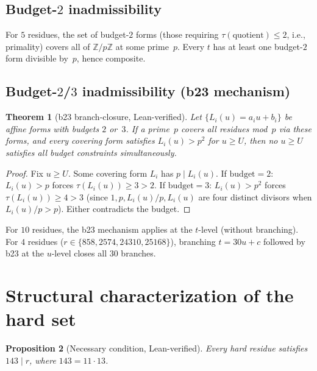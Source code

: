 \documentclass[11pt]{article}
\renewcommand{\_}{\origunderscore\allowbreak}
\newtheorem{theorem}{Theorem}[section]
\newtheorem{proposition}[theorem]{Proposition}
\theoremstyle{definition}
\theoremstyle{remark}
\begin{document}
\subsection{Budget-$2$ inadmissibility}

For $5$ residues, the set of budget-$2$ forms (those requiring
$\tau(\text{quotient})\le 2$, i.e., primality) covers all of
$\mathbb{Z}/p\mathbb{Z}$ at some prime~$p$. Every $t$ has at
least one budget-$2$ form divisible by~$p$, hence composite.

\subsection{Budget-$2$/$3$ inadmissibility (b23 mechanism)}

\begin{theorem}[b23 branch-closure, Lean-verified]
Let $\{L_i(u)=a_i u+b_i\}$ be affine forms with budgets $2$ or~$3$.
If a prime~$p$ covers all residues mod~$p$ via these forms, and every
covering form satisfies $L_i(u)>p^2$ for $u\ge U$, then no $u\ge U$
satisfies all budget constraints simultaneously.
\end{theorem}

\begin{proof}
Fix $u\ge U$. Some covering form $L_i$ has $p\mid L_i(u)$.
If $\text{budget}=2$: $L_i(u)>p$ forces $\tau(L_i(u))\ge 3>2$.
If $\text{budget}=3$: $L_i(u)>p^2$ forces $\tau(L_i(u))\ge 4>3$
(since $1,p,L_i(u)/p,L_i(u)$ are four distinct divisors when
$L_i(u)/p>p$). Either contradicts the budget.
\end{proof}

For $10$ residues, the b23 mechanism applies at the $t$-level
(without branching). For $4$ residues ($r\in\{858,2574,24310,25168\}$),
branching $t=30u+c$ followed by b23 at the $u$-level closes all
$30$ branches.

\section{Structural characterization of the hard set}\label{sec:hard}

\begin{proposition}[Necessary condition, Lean-verified]
Every hard residue satisfies $143\mid r$, where $143=11\cdot 13$.
\end{proposition}
\end{document}
